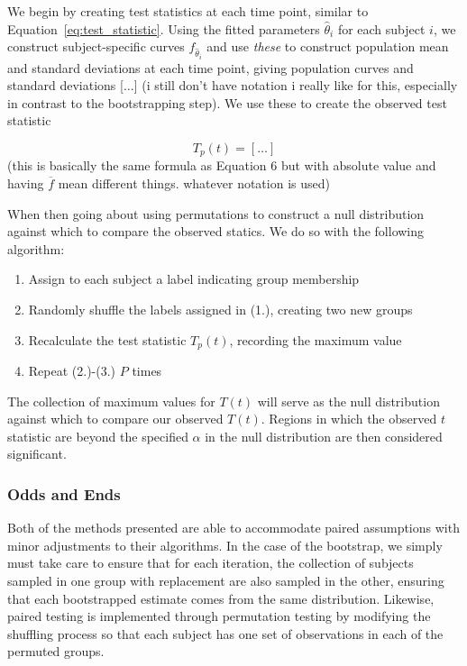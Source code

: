 \documentclass{article}
\begin{document}
We begin by creating test statistics at each time point, similar to Equation~\ref{eq:test_statistic}. Using the fitted parameters $\hat{\theta}_i$ for each subject $i$, we construct subject-specific curves $f_{\hat{\theta}_i}$ and use \textit{these} to construct population mean and standard deviations at each time point, giving population curves and standard deviations [$\dots$] (i still don't have notation i really like for this, especially in contrast to the bootstrapping step). We use these to create the observed test statistic

\begin{equation}
T_p(t) = [\dots] 
\end{equation}
(this is basically the same formula as Equation 6 but with absolute value and having $\overline{f}$ mean different things. whatever notation is used)

When then going about using permutations to construct a null distribution against which to compare the observed statics. We do so with the following algorithm:

\begin{enumerate}
\item Assign to each subject a label indicating group membership
\item Randomly shuffle the labels assigned in (1.), creating two new groups 
\item Recalculate the test statistic $T_p(t)$, recording the maximum value
\item Repeat (2.)-(3.) $P$ times
\end{enumerate}

The collection of maximum values for $T(t)$ will serve as the null distribution against which to compare our observed $T(t)$. Regions in which the observed $t$ statistic are beyond the specified $\alpha$ in the null distribution are then considered significant.

\subsubsection{Odds and Ends}

Both of the methods presented are able to accommodate paired assumptions with minor adjustments to their algorithms. In the case of the bootstrap, we simply must take care to ensure that for each iteration, the collection of subjects sampled in one group with replacement are also sampled in the other, ensuring that each bootstrapped estimate comes from the same distribution. Likewise, paired testing is implemented through permutation testing by modifying the shuffling process so that each subject has one set of observations in each of the permuted groups.
\end{document}

